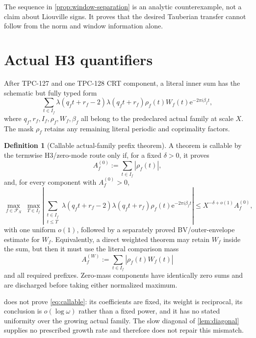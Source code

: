 \documentclass[11pt]{article}
\theoremstyle{definition}
\newtheorem{definition}[theorem]{Definition}
\theoremstyle{remark}
\newcommand{\e}{\mathrm e}
\begin{document}
The sequence in \cref{prop:window-separation} is an analytic
counterexample, not a claim about Liouville signs.  It proves that
the desired Tauberian transfer cannot follow from the norm and
window information alone.

\section{Actual H3 quantifiers}

After TPC-127 and one TPC-128 CRT component, a literal inner sum has
the schematic but fully typed form
\begin{equation}
 \sum_{t\in I_f}
 \lambda(q_ft+r_f-2)\lambda(q_ft+r_f)
 \rho_f(t)W_f(t)\e^{-2\pi i\beta_ft},
\label{eq:actual-component}
\end{equation}
where \(q_f,r_f,I_f,\rho_f,W_f,\beta_f\) all belong to the
predeclared actual family at scale \(X\).  The mask \(\rho_f\)
retains any remaining literal periodic and coprimality factors.

\begin{definition}[Callable actual-family prefix theorem]
\label{def:callable}
A theorem is callable by the termwise H3/zero-mode route only if,
for a fixed \(\delta>0\), it proves
\[
 A_f^{(0)}
 :=
 \sum_{t\in I_f}|\rho_f(t)|,
\]
and, for every component with \(A_f^{(0)}>0\),
\begin{equation}
 \max_{f\in\mathcal F_X}\;
 \max_{T\in I_f}
 \left|
 \sum_{\substack{t\in I_f\\t\le T}}
 \lambda(q_ft+r_f-2)\lambda(q_ft+r_f)
 \rho_f(t)\e^{-2\pi i\beta_ft}
 \right|
 \le X^{-\delta+o(1)}A_f^{(0)},
\label{eq:callable}
\end{equation}
with one uniform \(o(1)\), followed by a separately proved
BV/outer-envelope estimate for \(W_f\).  Equivalently, a direct
weighted theorem may retain \(W_f\) inside the sum, but then it must
use the literal comparison mass
\[
 A_f^{(W)}
 :=
 \sum_{t\in I_f}|\rho_f(t)W_f(t)|
\]
and all required prefixes.  Zero-mass components have identically
zero sums and are discharged before taking either normalized
maximum.
\end{definition}

 does not prove \eqref{eq:callable}: its coefficients
are fixed, its weight is reciprocal, its conclusion is
\(o(\log\omega)\) rather than a fixed power, and it has no stated
uniformity over the growing actual family.  The slow diagonal of
\cref{lem:diagonal} supplies no prescribed growth rate and therefore
does not repair this mismatch.
\end{document}
